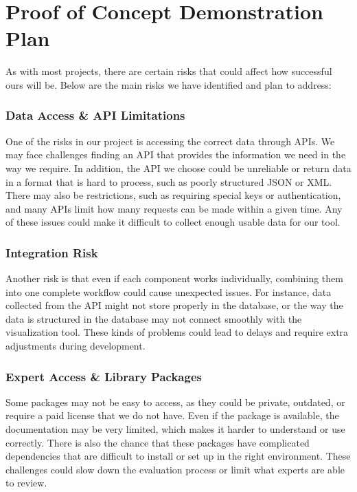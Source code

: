\documentclass{article}
\begin{document}
\section{Proof of Concept Demonstration Plan}

As with most projects, there are certain risks that could affect how successful ours will be. Below are the main risks we have identified and plan to address:

\subsubsection*{Data Access \& API Limitations}\vspace{-0.5em}
One of the risks in our project is accessing the correct data through APIs. We may face challenges finding an API that provides the information we need in the way we require. In addition, the API we choose could be unreliable or return data in a format that is hard to process, such as poorly structured JSON or XML. There may also be restrictions, such as requiring special keys or authentication, and many APIs limit how many requests can be made within a given time. Any of these issues could make it difficult to collect enough usable data for our tool.
\subsubsection*{Integration Risk}\vspace{-0.5em}
Another risk is that even if each component works individually, combining them into one complete workflow could cause unexpected issues. For instance, data collected from the API might not store properly in the database, or the way the data is structured in the database may not connect smoothly with the visualization tool. These kinds of problems could lead to delays and require extra adjustments during development.
\subsubsection*{Expert Access \& Library Packages}\vspace{-0.5em}
Some packages may not be easy to access, as they could be private, outdated, or require a paid license that we do not have. Even if the package is available, the documentation may be very limited, which makes it harder to understand or use correctly. There is also the chance that these packages have complicated dependencies that are difficult to install or set up in the right environment. These challenges could slow down the evaluation process or limit what experts are able to review.
\end{document}
